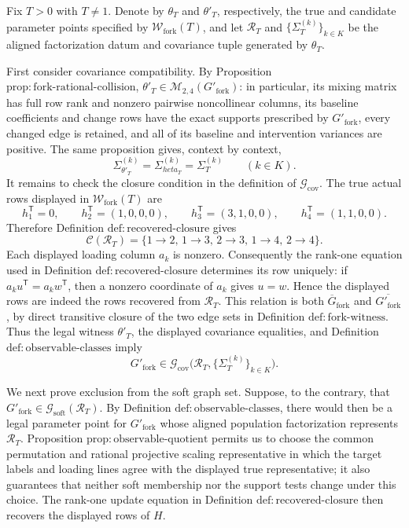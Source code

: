 Fix \(T>0\) with \(T\ne 1\).  Denote by \(\theta_T\) and \(\theta'_T\), respectively, the true and candidate parameter points specified by \(\mathcal W_{\mathrm{fork}}(T)\), and let \(\mathcal R_T\) and \(\{\Sigma_T^{(k)}\}_{k\in K}\) be the aligned factorization datum and covariance tuple generated by \(\theta_T\).

First consider covariance compatibility.  By Proposition \(\mathrm{prop{:}fork\text{-}rational\text{-}collision}\), \(\theta'_T\in\mathcal M_{2,4}(G'_{\mathrm{fork}})\): in particular, its mixing matrix has full row rank and nonzero pairwise noncollinear columns, its baseline coefficients and change rows have the exact supports prescribed by \(G'_{\mathrm{fork}}\), every changed edge is retained, and all of its baseline and intervention variances are positive.  The same proposition gives, context by context,
\[
 \Sigma_{\theta'_T}^{(k)}=\Sigma_{	heta_T}^{(k)}=\Sigma_T^{(k)}
 \qquad(k\in K).
\]
It remains to check the closure condition in the definition of \(\mathcal G_{\mathrm{cov}}\).  The true actual rows displayed in \(\mathcal W_{\mathrm{fork}}(T)\) are
\[
 h_1^{\mathsf T}=0,\qquad
 h_2^{\mathsf T}=(1,0,0,0),\qquad
 h_3^{\mathsf T}=(3,1,0,0),\qquad
 h_4^{\mathsf T}=(1,1,0,0).
\]
Therefore Definition \(\mathrm{def{:}recovered\text{-}closure}\) gives
\[
 \mathcal C(\mathcal R_T)
 =\{1\to2,\,1\to3,\,2\to3,\,1\to4,\,2\to4\}.
\]
Each displayed loading column \(a_k\) is nonzero.  Consequently the rank-one equation used in Definition \(\mathrm{def{:}recovered\text{-}closure}\) determines its row uniquely: if \(a_ku^{\mathsf T}=a_kw^{\mathsf T}\), then a nonzero coordinate of \(a_k\) gives \(u=w\).  Hence the displayed rows are indeed the rows recovered from \(\mathcal R_T\).  This relation is both \(\overline G_{\mathrm{fork}}\) and \(\overline {G'_{\mathrm{fork}}}\), by direct transitive closure of the two edge sets in Definition \(\mathrm{def{:}fork\text{-}witness}\).  Thus the legal witness \(\theta'_T\), the displayed covariance equalities, and Definition \(\mathrm{def{:}observable\text{-}classes}\) imply
\[
 G'_{\mathrm{fork}}\in
 \mathcal G_{\mathrm{cov}}
 \bigl(\mathcal R_T,\{\Sigma_T^{(k)}\}_{k\in K}\bigr).
\]

We next prove exclusion from the soft graph set.  Suppose, to the contrary, that
\(G'_{\mathrm{fork}}\in\mathcal G_{\mathrm{soft}}(\mathcal R_T)\).  By Definition \(\mathrm{def{:}observable\text{-}classes}\), there would then be a legal parameter point for \(G'_{\mathrm{fork}}\) whose aligned population factorization represents \(\mathcal R_T\).  Proposition \(\mathrm{prop{:}observable\text{-}quotient}\) permits us to choose the common permutation and rational projective scaling representative in which the target labels and loading lines agree with the displayed true representative; it also guarantees that neither soft membership nor the support tests change under this choice.  The rank-one update equation in Definition \(\mathrm{def{:}recovered\text{-}closure}\) then recovers the displayed rows of \(H\).

